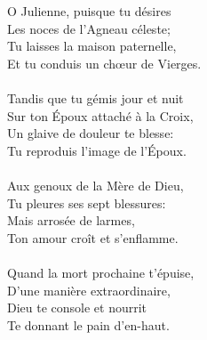 O Julienne, puisque tu désires\\
Les noces de l’Agneau céleste;\\
Tu laisses la maison paternelle,\\
Et tu conduis un chœur de Vierges.\\
\\
Tandis que tu gémis jour et nuit\\
Sur ton Époux attaché à la Croix,\\
Un glaive de douleur te blesse:\\
Tu reproduis l’image de l’Époux.\\
\\
Aux genoux de la Mère de Dieu,\\
Tu pleures ses sept blessures:\\
Mais arrosée de larmes,\\
Ton amour croît et s’enflamme.\\
\\
Quand la mort prochaine t’épuise,\\
D’une manière extraordinaire,\\
Dieu te console et nourrit\\
Te donnant le pain d’en-haut.